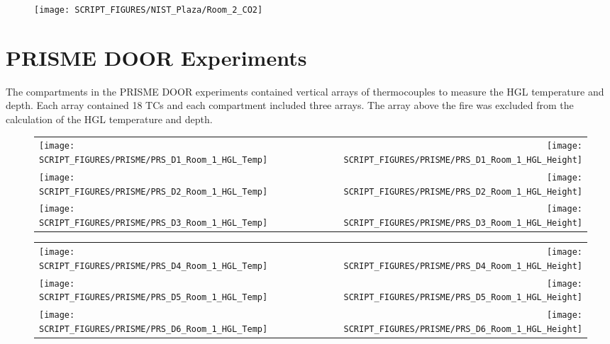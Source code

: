 \begin{figure}
\begin{center}
\texttt{[image: SCRIPT\_FIGURES/NIST\_Plaza/Room\_2\_CO2]}
\end{center}
\end{figure}

\clearpage

\section{PRISME DOOR Experiments}

The compartments in the PRISME DOOR experiments contained vertical arrays of thermocouples to measure the HGL temperature and depth. Each array contained 18 TCs and each compartment included three arrays. The array above the fire was excluded from the calculation of the HGL temperature and depth.

\begin{figure}[!ht]
\begin{tabular*}{\textwidth}{l@{\extracolsep{\fill}}r}
\texttt{[image: SCRIPT\_FIGURES/PRISME/PRS\_D1\_Room\_1\_HGL\_Temp]} &
\texttt{[image: SCRIPT\_FIGURES/PRISME/PRS\_D1\_Room\_1\_HGL\_Height]} \\
\texttt{[image: SCRIPT\_FIGURES/PRISME/PRS\_D2\_Room\_1\_HGL\_Temp]} &
\texttt{[image: SCRIPT\_FIGURES/PRISME/PRS\_D2\_Room\_1\_HGL\_Height]} \\
\texttt{[image: SCRIPT\_FIGURES/PRISME/PRS\_D3\_Room\_1\_HGL\_Temp]} &
\texttt{[image: SCRIPT\_FIGURES/PRISME/PRS\_D3\_Room\_1\_HGL\_Height]}
\end{tabular*}
\label{PRISME_HGL_1}
\end{figure}

\begin{figure}[p]
\begin{tabular*}{\textwidth}{l@{\extracolsep{\fill}}r}
\texttt{[image: SCRIPT\_FIGURES/PRISME/PRS\_D4\_Room\_1\_HGL\_Temp]} &
\texttt{[image: SCRIPT\_FIGURES/PRISME/PRS\_D4\_Room\_1\_HGL\_Height]} \\
\texttt{[image: SCRIPT\_FIGURES/PRISME/PRS\_D5\_Room\_1\_HGL\_Temp]} &
\texttt{[image: SCRIPT\_FIGURES/PRISME/PRS\_D5\_Room\_1\_HGL\_Height]} \\
\texttt{[image: SCRIPT\_FIGURES/PRISME/PRS\_D6\_Room\_1\_HGL\_Temp]} &
\texttt{[image: SCRIPT\_FIGURES/PRISME/PRS\_D6\_Room\_1\_HGL\_Height]}
\end{tabular*}
\label{PRISME_HGL_2}
\end{figure}

